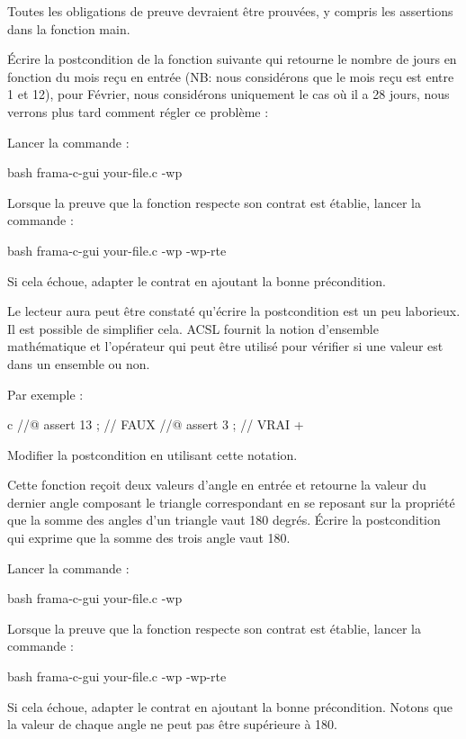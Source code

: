 Toutes les obligations de preuve devraient être prouvées, y compris les
assertions dans la fonction main.




Écrire la postcondition de la fonction suivante qui retourne le nombre de
jours en fonction du mois reçu en entrée (NB: nous considérons que le mois
reçu est entre 1 et 12), pour Février, nous considérons uniquement le cas
où il a 28 jours, nous verrons plus tard comment régler ce problème :




Lancer la commande :


\begin{CodeBlock}{bash}
frama-c-gui your-file.c -wp
\end{CodeBlock}


Lorsque la preuve que la fonction respecte son contrat est établie, lancer
la commande :

\begin{CodeBlock}{bash}
frama-c-gui your-file.c -wp -wp-rte
\end{CodeBlock}


Si cela échoue, adapter le contrat en ajoutant la bonne précondition.


Le lecteur aura peut être constaté qu'écrire la postcondition est un peu
laborieux. Il est possible de simplifier cela. ACSL fournit la notion
d'ensemble mathématique et l'opérateur  qui
peut être utilisé pour vérifier si une valeur est dans un ensemble ou non.


Par exemple :

\begin{CodeBlock}{c}
//@ assert 13  ; // FAUX
//@ assert 3   ; // VRAI
+\end{CodeBlock}


Modifier la postcondition en utilisant cette notation.




Cette fonction reçoit deux valeurs d'angle en entrée et retourne
la valeur du dernier angle composant le triangle correspondant en se
reposant sur la propriété que la somme des angles d'un triangle vaut
180 degrés. Écrire la postcondition qui exprime que la somme des trois
angle vaut 180.




Lancer la commande :


\begin{CodeBlock}{bash}
frama-c-gui your-file.c -wp
\end{CodeBlock}


Lorsque la preuve que la fonction respecte son contrat est établie, lancer
la commande :

\begin{CodeBlock}{bash}
frama-c-gui your-file.c -wp -wp-rte
\end{CodeBlock}


Si cela échoue, adapter le contrat en ajoutant la bonne précondition.
Notons que la valeur de chaque angle ne peut pas être supérieure à 180.
